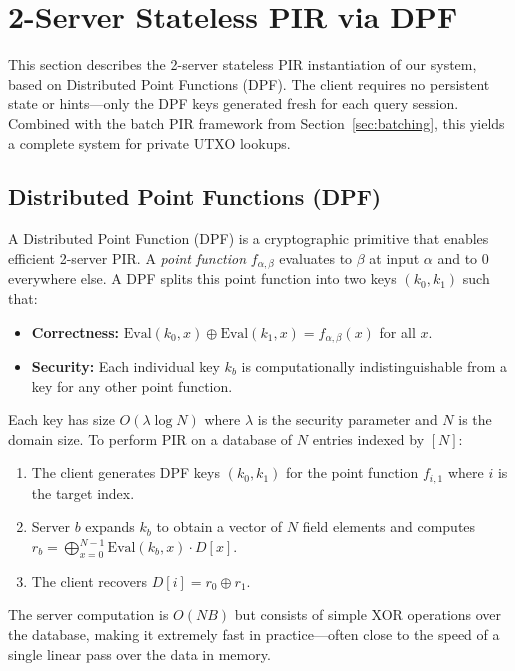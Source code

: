 \section{2-Server Stateless PIR via DPF}
\label{sec:2server}

This section describes the 2-server stateless PIR instantiation of our system, based on Distributed Point Functions (DPF). The client requires no persistent state or hints---only the DPF keys generated fresh for each query session. Combined with the batch PIR framework from Section~\ref{sec:batching}, this yields a complete system for private UTXO lookups.

\subsection{Distributed Point Functions (DPF)}
\label{sec:dpf}

A Distributed Point Function (DPF) \cite{gilboa2014dpf,boyle2015fss,boyle2016fss} is a cryptographic primitive that enables efficient 2-server PIR. A \emph{point function} $f_{\alpha,\beta}$ evaluates to $\beta$ at input $\alpha$ and to $0$ everywhere else. A DPF splits this point function into two keys $(k_0, k_1)$ such that:
\begin{itemize}[nolistsep,leftmargin=*]
    \item \textbf{Correctness:} $\text{Eval}(k_0, x) \oplus \text{Eval}(k_1, x) = f_{\alpha,\beta}(x)$ for all $x$.
    \item \textbf{Security:} Each individual key $k_b$ is computationally indistinguishable from a key for any other point function.
\end{itemize}

Each key has size $O(\lambda \log N)$ where $\lambda$ is the security parameter and $N$ is the domain size. To perform PIR on a database of $N$ entries indexed by $[N]$:
\begin{enumerate}[nolistsep,leftmargin=*]
    \item The client generates DPF keys $(k_0, k_1)$ for the point function $f_{i, 1}$ where $i$ is the target index.
    \item Server $b$ expands $k_b$ to obtain a vector of $N$ field elements and computes $r_b = \bigoplus_{x=0}^{N-1} \text{Eval}(k_b, x) \cdot D[x]$.
    \item The client recovers $D[i] = r_0 \oplus r_1$.
\end{enumerate}

The server computation is $O(NB)$ but consists of simple XOR operations over the database, making it extremely fast in practice---often close to the speed of a single linear pass over the data in memory.

